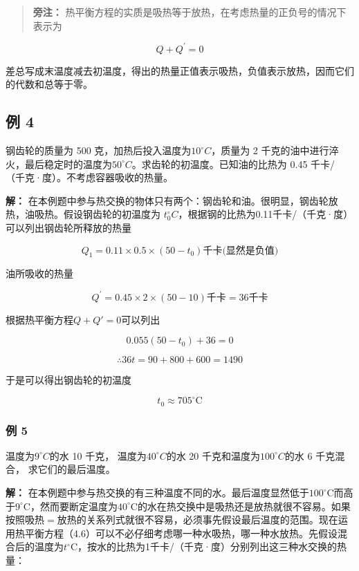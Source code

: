 \begin{quote}
\textbf{旁注：}
热平衡方程的实质是吸热等于放热，在考虑热量的正负号的情况下表示为
\end{quote}

\[
Q + Q ^ {\prime} = 0
\]

差总写成末温度减去初温度，得出的热量正值表示吸热，负值表示放热，因而它们的代数和总等于零。

\subsection{例 4}\label{ux4f8b-4-2}

钢齿轮的质量为 500 克，加热后投入温度为\(10^{\circ}C\)，质量为 2
千克的油中进行淬火，最后稳定时的温度为\(50^{\circ}C\)。求齿轮的初温度。已知油的比热为
0.45 千卡/（千克·度）。不考虑容器吸收的热量。

\textbf{解：}
在本例题中参与热交换的物体只有两个：钢齿轮和油。很明显，钢齿轮放热，油吸热。假设钢齿轮的初温度为
\(t_{0}^{\circ}C\)，根据钢的比热为0.11千卡/（千克·度）可以列出钢齿轮所释放的热量

\[
Q _ {1} = 0.11 \times 0.5 \times (50 - t _ {0}) \text{千卡(显然是负值)}
\]

油所吸收的热量

\[
Q ^ {\prime} = 0.45 \times 2 \times (50 - 10) \text{千卡} = 36 \text{千卡}
\]

根据热平衡方程\(Q + Q' = 0\)可以列出

\[
0.055 (50 - t _ {0}) + 36 = 0
\]

\[
\therefore 36t=90+800+600=1490
\]

于是可以得出钢齿轮的初温度

\[
t _ {0} \approx 705 ^ {\circ} \mathrm{C}
\]

\subsubsection{例 5}\label{ux4f8b-5-1}

温度为\(9^{\circ}C\)的水 10 千克， 温度为\(40^{\circ}C\)的水 20
千克和温度为\(100^{\circ}C\)的水 6 千克混合， 求它们的最后温度。

\textbf{解：}
在本例题中参与热交换的有三种温度不同的水。最后温度显然低于\(100^{\circ}\mathrm{C}\)而高于\(9^{\circ}\mathrm{C}\)，然而要断定温度为\(40^{\circ}\mathrm{C}\)的水在热交换中是吸热还是放热就很不容易。如果按照吸热\(=\)放热的关系列式就很不容易，必须事先假设最后温度的范围。现在运用热平衡方程（4.6）可以不必仔细考虑哪一种水吸热，哪一种水放热。先假设混合后的温度为\(t^{\circ}\mathrm{C}\)，按水的比热为1千卡/（千克·度）分别列出这三种水交换的热量：

